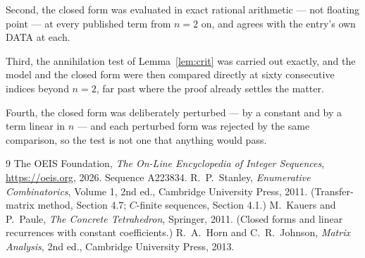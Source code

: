 \documentclass[11pt,a4paper]{article}
\theoremstyle{plain}
\theoremstyle{definition}
\begin{document}
Second, the closed form was evaluated in exact rational arithmetic --- not floating point ---
at every published term from $n=2$ on, and agrees with the entry's own DATA at each.

Third, the annihilation test of Lemma~\ref{lem:crit} was carried out exactly, and the model
and the closed form were then compared directly at sixty consecutive indices beyond
$n=2$, far past where the proof already settles the matter.

Fourth, the closed form was deliberately perturbed --- by a constant and by a term linear in
$n$ --- and each perturbed form was rejected by the same comparison, so the test is not one
that anything would pass.

\begin{thebibliography}{9}
 The OEIS Foundation, \emph{The On-Line Encyclopedia of Integer
Sequences}, \url{https://oeis.org}, 2026. Sequence A223834.
 R.~P.~Stanley, \emph{Enumerative Combinatorics}, Volume 1, 2nd ed.,
Cambridge University Press, 2011. (Transfer-matrix method, Section 4.7; $C$-finite sequences,
Section 4.1.)
 M.~Kauers and P.~Paule, \emph{The Concrete Tetrahedron}, Springer, 2011.
(Closed forms and linear recurrences with constant coefficients.)
 R.~A.~Horn and C.~R.~Johnson, \emph{Matrix Analysis}, 2nd ed., Cambridge
University Press, 2013.
\end{thebibliography}
\end{document}
